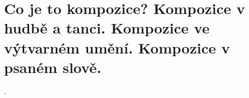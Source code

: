 \section{Co je to kompozice? Kompozice v hudbě a tanci. Kompozice ve výtvarném umění. Kompozice v psaném slově.}.